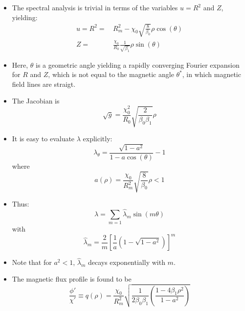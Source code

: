 \begin{itemize}
\item
The spectral analysis is trivial in terms of the variables
$u = R^2$ and $Z$, yielding:
\begin{align}
 u =
 R^2 =&\, R_m^2 - \chi_0 \sqrt{\frac{8}{\beta_0}} \rho \cos(\theta) \\
 Z   =&\, \frac{\chi_0}{R_0} \frac{1}{\sqrt{\beta_1}} \rho \sin(\theta)
\end{align}

\item
Here, $\theta$ is a geometric angle
yielding a rapidly converging Fourier expansion for $R$ and $Z$,
which is not equal to the magnetic angle $\theta^*$,
in which magnetic field lines are straigt.

\item
The Jacobian is
\begin{equation}
 \sqrt{g} = \frac{\chi_0^2}{R_0} \sqrt{\frac{2}{\beta_0 \beta_1}} \rho
\end{equation}

\item
It is easy to evaluate $\lambda$ explicitly:
\begin{equation}
 \lambda_\theta = \frac{\sqrt{1 - a^2}}{1 - a \cos(\theta)} - 1
\end{equation}
where
\begin{equation}
 a(\rho) = \frac{\chi_0}{R_m^2} \sqrt{\frac{8}{\beta_0}} \rho < 1 \label{eqn:def_a}
\end{equation}

\item
Thus:
\begin{equation}
 \lambda = \sum_{m = 1} \hat{\lambda}_m \sin(m \theta)
\end{equation}
with
\begin{equation}
 \hat{\lambda}_m = \frac{2}{m} \left[ \frac{1}{a} \left( 1 - \sqrt{1 - a^2} \right) \right]^m
\end{equation}


\item
Note that for $a^2 < 1$, $\hat{\lambda}_m$ decays exponentially with $m$.

\item
The magnetic flux profile is found to be
\begin{equation}
 \frac{\phi'}{\chi'} \equiv q(\rho)
 = \frac{\chi_0}{R_m^2}
 \sqrt{
   \frac{1}{2 \beta_0 \beta_1} \left( \frac{1 - 4 \beta_1 \rho^2}{1 - a^2} \right)
 }
\end{equation}

\end{itemize}


